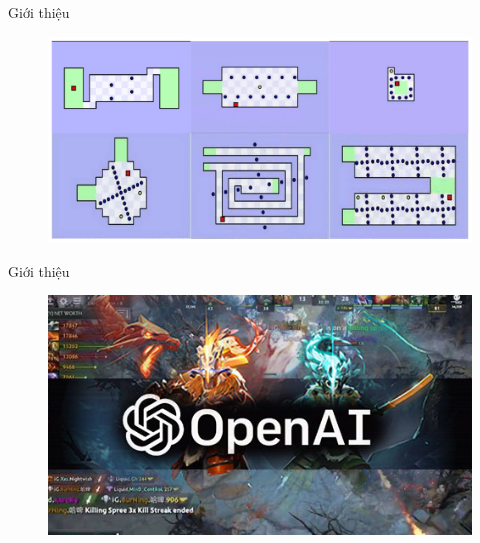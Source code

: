 \documentclass{beamer}
\begin{document}
\begin{frame}{Giới thiệu}
\begin{figure}
    \centering
    \includegraphics[width=\linewidth]{Pic/slide/WHG_level.pdf}
    \captionsetup{labelformat=empty}
\end{figure}
\end{frame}
\begin{frame}{Giới thiệu}
\begin{figure}
    \centering
    \includegraphics[width=\linewidth]{Pic/slide/openai-beats-dota-2-pros-elon-musk-warns-ai-risk-scarier-n-korea.jpg}
    \captionsetup{labelformat=empty}
\end{figure}
\end{frame}
\end{document}
